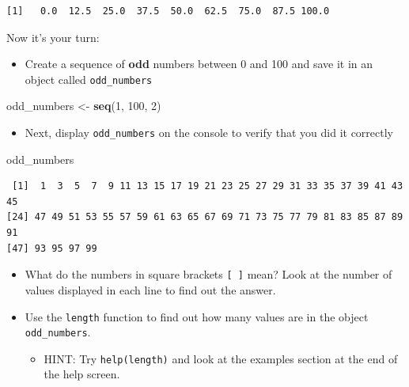 \documentclass[]{book}
\newenvironment{Shaded}{\begin{snugshade}}{\end{snugshade}}
\newcommand{\KeywordTok}[1]{\textcolor[rgb]{0.13,0.29,0.53}{\textbf{#1}}}
\newcommand{\DecValTok}[1]{\textcolor[rgb]{0.00,0.00,0.81}{#1}}
\newcommand{\StringTok}[1]{\textcolor[rgb]{0.31,0.60,0.02}{#1}}
\newcommand{\NormalTok}[1]{#1}
\providecommand{\tightlist}{%
  \setlength{\itemsep}{0pt}\setlength{\parskip}{0pt}}
\theoremstyle{definition}
\theoremstyle{definition}
\theoremstyle{definition}
\theoremstyle{remark}
\begin{document}
\begin{verbatim}
[1]   0.0  12.5  25.0  37.5  50.0  62.5  75.0  87.5 100.0
\end{verbatim}

Now it's your turn:

\begin{itemize}
\tightlist
\item
  Create a sequence of \textbf{odd} numbers between 0 and 100 and save
  it in an object called \texttt{odd\_numbers}
\end{itemize}

\begin{Shaded}
\begin{Highlighting}[]
\NormalTok{odd_numbers <-}\StringTok{ }\KeywordTok{seq}\NormalTok{(}\DecValTok{1}\NormalTok{, }\DecValTok{100}\NormalTok{, }\DecValTok{2}\NormalTok{)}
\end{Highlighting}
\end{Shaded}

\begin{itemize}
\tightlist
\item
  Next, display \texttt{odd\_numbers} on the console to verify that you
  did it correctly
\end{itemize}

\begin{Shaded}
\begin{Highlighting}[]
\NormalTok{odd_numbers}
\end{Highlighting}
\end{Shaded}

\begin{verbatim}
 [1]  1  3  5  7  9 11 13 15 17 19 21 23 25 27 29 31 33 35 37 39 41 43 45
[24] 47 49 51 53 55 57 59 61 63 65 67 69 71 73 75 77 79 81 83 85 87 89 91
[47] 93 95 97 99
\end{verbatim}

\begin{itemize}
\item
  What do the numbers in square brackets \texttt{{[}\ {]}} mean? Look at
  the number of values displayed in each line to find out the answer.
\item
  Use the \texttt{length} function to find out how many values are in
  the object \texttt{odd\_numbers}.

  \begin{itemize}
  \tightlist
  \item
    HINT: Try \texttt{help(length)} and look at the examples section at
    the end of the help screen.
  \end{itemize}
\end{itemize}
\end{document}

